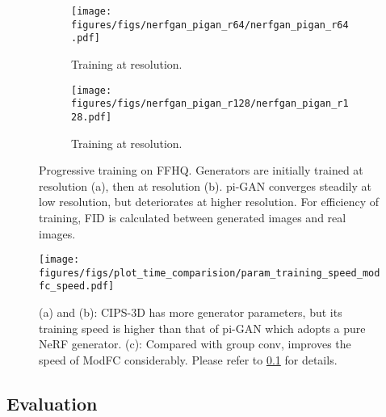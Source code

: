 \documentclass[10pt,twocolumn,letterpaper]{article}
\begin{document}
\begin{figure}[!t]
  \begin{subfigure}[]{0.49\linewidth}
    \centering
    \captionsetup{justification=centering,margin=0cm}
    \texttt{[image: figures/figs/nerfgan\_pigan\_r64/nerfgan\_pigan\_r64.pdf]}
\caption{Training at  resolution.}
    \label{fig:sub:progressive_64}
  \end{subfigure}\hspace{0.01\linewidth}
  \begin{subfigure}[]{0.49\linewidth}
    \centering
    \captionsetup{justification=centering,margin=0cm}
    \texttt{[image: figures/figs/nerfgan\_pigan\_r128/nerfgan\_pigan\_r128.pdf]}
\caption{Training at  resolution.}
    \label{fig:sub:progressive_128}
  \end{subfigure}
  \vspace{-0.3cm}
  \caption{Progressive training on FFHQ. Generators are initially trained at  resolution (a), then at  resolution (b). pi-GAN converges steadily at low resolution, but deteriorates at higher resolution. For efficiency of training, FID is calculated between  generated images and  real images.}
  \label{fig:progressive_training}
  \vspace{-0.3cm}
\end{figure}

\begin{figure}[!t]
  \centering
  \texttt{[image: figures/figs/plot\_time\_comparision/param\_training\_speed\_modfc\_speed.pdf]}
\vspace{-0.3cm}
  \caption{(a) and (b): CIPS-3D has more generator parameters, but its training speed is higher than that of pi-GAN which adopts a pure NeRF generator. (c): Compared with group conv,  improves the speed of ModFC considerably. Please refer to \cref{sec:exp:evaluation} for details.}
  \label{fig:params_speed}
  \vspace{-0.5cm}
\end{figure}


\subsection{Evaluation}
\label{sec:exp:evaluation}
\end{document}
